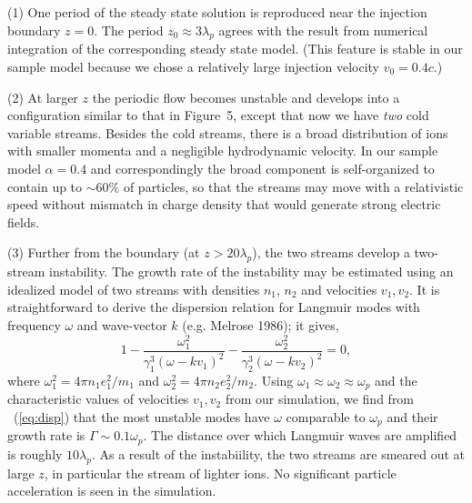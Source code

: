 \noindent
(1) One period of the steady state solution is reproduced near the injection
boundary $z=0$. The period $z_0\approx 3\lambda_p$ agrees with the result
from numerical integration of the corresponding steady state model.
(This feature is stable in our sample model
because we chose a relatively large injection velocity $v_0=0.4c$.)

\noindent
(2) At larger $z$ the periodic flow becomes unstable and develops into a
configuration similar to that in Figure~5, except that now we have {\it two}
cold variable streams. Besides the cold streams, there is a broad distribution
of ions with smaller momenta and a negligible hydrodynamic velocity.
In our sample model $\alpha=0.4$ and
correspondingly the broad component is self-organized to contain up to
$\sim 60\%$ of particles, so that the streams may move with a relativistic speed
without mismatch in charge density that would generate strong electric fields.

\noindent
(3) Further from the boundary (at $z>20\lambda_p$), the two streams
develop a two-stream instability. The growth rate of the instability may be
estimated using an idealized model of two streams with densities $n_1$,
$n_2$ and velocities $v_1,v_2$. It is straightforward to derive the dispersion
relation for Langmuir modes with frequency $\omega$ and wave-vector $k$
(e.g. Melrose 1986); it gives,
\begin{equation}
\label{eq:disp}
    1-\frac{\omega_1^{2}}{\gamma_1^3(\omega - kv_1)^2} - \frac{\omega_2^{2}}{\gamma_2^3(\omega - kv_2)^2} = 0,
\end{equation}
where $\omega_1^2=4\pi n_1 e_1^2/m_1$ and $\omega_2^2=4\pi n_2 e_2^2/m_2$.
Using $\omega_1\approx\omega_2\approx\omega_p$ and the characteristic values
of velocities $v_1,v_2$ from our simulation, we find from \Eq~(\ref{eq:disp}) that
the most unstable modes have $\omega$ comparable to $\omega_p$ and their
growth rate is $\Gamma\sim 0.1\omega_p$.
The distance over which Langmuir waves are amplified is roughly
 $10\lambda_p$.
As a result of the instabiility, the two streams are smeared out at large $z$,
in particular the stream of lighter ions.
No significant particle acceleration is seen in the simulation.

